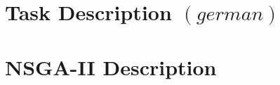 \documentclass[./\jobname.tex]{subfiles}
\begin{document}
\chapter{Task Description $\left( german \right) $}


\chapter{NSGA-II Description}
\label{chap: NSGA2_Description}

\end{document}
